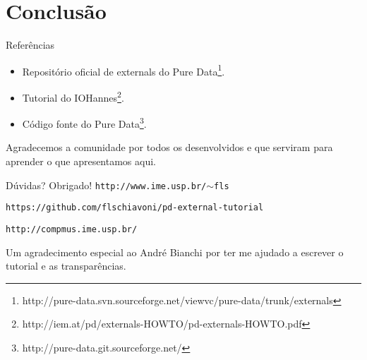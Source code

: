 \section{Conclusão}

\begin{frame}{Referências}
\begin{itemize}
\item Repositório oficial de externals do Pure Data\footnote{http://pure-data.svn.sourceforge.net/viewvc/pure-data/trunk/externals}.
\item Tutorial do IOHannes\footnote{http://iem.at/pd/externals-HOWTO/pd-externals-HOWTO.pdf}.
\item Código fonte do Pure Data\footnote{http://pure-data.git.sourceforge.net/}.
\end{itemize}

Agradecemos a comunidade por todos os \externals desenvolvidos e que serviram
para aprender o que apresentamos aqui.

\end{frame}


\begin{frame}{Dúvidas?}
{Obrigado!}
\texttt{http://www.ime.usp.br/$\sim$fls}

\texttt{https://github.com/flschiavoni/pd-external-tutorial}

\texttt{http://compmus.ime.usp.br/}


\vspace{2cm}
Um agradecimento especial ao André Bianchi por ter me ajudado a escrever o
tutorial e as transparências.
\end{frame}
